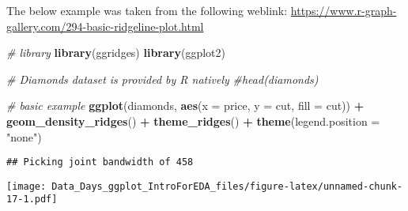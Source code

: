 \documentclass[
]{article}
\newenvironment{Shaded}{\begin{snugshade}}{\end{snugshade}}
\newcommand{\CommentTok}[1]{\textcolor[rgb]{0.56,0.35,0.01}{\textit{#1}}}
\newcommand{\DataTypeTok}[1]{\textcolor[rgb]{0.13,0.29,0.53}{#1}}
\newcommand{\KeywordTok}[1]{\textcolor[rgb]{0.13,0.29,0.53}{\textbf{#1}}}
\newcommand{\NormalTok}[1]{#1}
\newcommand{\OperatorTok}[1]{\textcolor[rgb]{0.81,0.36,0.00}{\textbf{#1}}}
\newcommand{\StringTok}[1]{\textcolor[rgb]{0.31,0.60,0.02}{#1}}
\begin{document}
The below example was taken from the following weblink:
\url{https://www.r-graph-gallery.com/294-basic-ridgeline-plot.html}

\begin{Shaded}
\begin{Highlighting}[]
\CommentTok{# library}
\KeywordTok{library}\NormalTok{(ggridges)}
\KeywordTok{library}\NormalTok{(ggplot2)}
 
\CommentTok{# Diamonds dataset is provided by R natively}
\CommentTok{#head(diamonds)}
 
\CommentTok{# basic example}
\KeywordTok{ggplot}\NormalTok{(diamonds, }\KeywordTok{aes}\NormalTok{(}\DataTypeTok{x =}\NormalTok{ price, }\DataTypeTok{y =}\NormalTok{ cut, }\DataTypeTok{fill =}\NormalTok{ cut)) }\OperatorTok{+}
\StringTok{  }\KeywordTok{geom_density_ridges}\NormalTok{() }\OperatorTok{+}
\StringTok{  }\KeywordTok{theme_ridges}\NormalTok{() }\OperatorTok{+}\StringTok{ }
\StringTok{  }\KeywordTok{theme}\NormalTok{(}\DataTypeTok{legend.position =} \StringTok{"none"}\NormalTok{)}
\end{Highlighting}
\end{Shaded}

\begin{verbatim}
## Picking joint bandwidth of 458
\end{verbatim}

\texttt{[image: Data\_Days\_ggplot\_IntroForEDA\_files/figure-latex/unnamed-chunk-17-1.pdf]}
\end{document}
